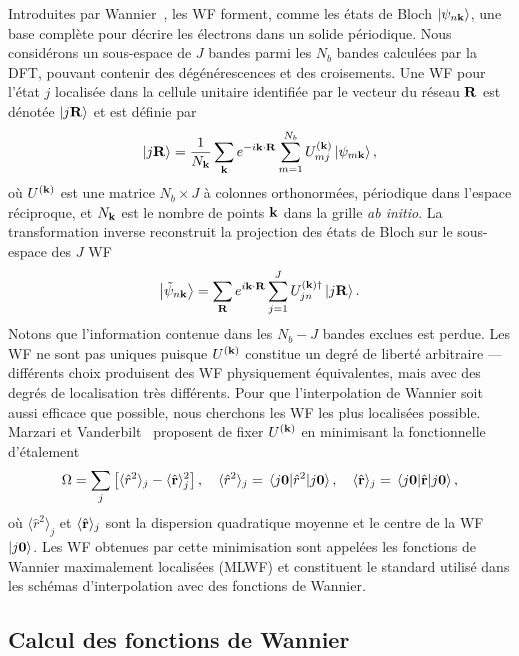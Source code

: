Introduites par Wannier~\cite{wannierStructureElectronicExcitation1937}, les WF forment, comme les états de Bloch $\ket{\psi_{n\mathbf{k}}}$, une base
complète pour décrire les électrons dans un solide périodique. Nous considérons
un sous-espace de $J$ bandes parmi les $N_b$ bandes calculées par
la DFT, pouvant contenir des dégénérescences et des croisements.
Une WF pour l'état $j$ localisée dans la cellule unitaire identifiée
par le vecteur du réseau $\mathbf{R}$ est dénotée $\ket{j\mathbf{R}}$ et est
définie par
\begin{equation}
    \ket{j\mathbf{R}} = \frac{1}{N_{\mathbf{k}}}\sum_{\mathbf{k}} e^{-i\mathbf{k}\cdot\mathbf{R}}
    \sum_{m=1}^{N_b} U_{mj}^{(\mathbf{k})}\ket{\psi_{m\mathbf{k}}},
    \label{eqn:c2_wf_1W}
\end{equation}
où $U^{(\mathbf{k})}$ est une matrice $N_b\times J$ à colonnes orthonormées,
périodique dans l'espace réciproque, et $N_{\mathbf{k}}$ est le nombre de
points $\mathbf{k}$ dans la grille \textit{ab initio}. La transformation
inverse reconstruit la projection des états de Bloch sur le
sous-espace des $J$ WF
\begin{equation}
    \ket{\tilde{\psi}_{n\mathbf{k}}}=\sum_{\mathbf{R}} e^{i\mathbf{k}\cdot\mathbf{R}}
    \sum_{j=1}^{J} U_{jn}^{(\mathbf{k})\dag}\ket{j\mathbf{R}}.
    \label{eqn:c2_wf_1B}
\end{equation}
Notons que l'information contenue dans les $N_b - J$ bandes exclues est
perdue. Les WF ne sont pas uniques puisque $U^{(\mathbf{k})}$ constitue un degré
de liberté arbitraire --- différents choix produisent des WF
physiquement équivalentes, mais avec des degrés de localisation
très différents. Pour que l'interpolation de Wannier soit aussi efficace que possible, nous cherchons les WF les plus localisées possible. Marzari et Vanderbilt~\cite{marzariMaximallyLocalizedGeneralized1997} proposent de fixer $U^{(\mathbf{k})}$ en minimisant la fonctionnelle d'étalement
\begin{equation}
    \Omega = \sum_j\left[\langle \hat{r}^2\rangle_j - \langle \hat{\rv} \rangle^2_j\right],\quad  \langle \hat{r}^2\rangle_j = \matrixel{j\bm 0}{\hat{r}^2}{j\bm 0},\quad\langle \hat{\rv} \rangle_j = \matrixel{j\bm 0}{\hat{\rv}}{j\bm 0},\label{eqn:spread}
\end{equation}
où $\langle \hat{r}^2\rangle_j$ et $\langle\hat{\mathbf{r}}\rangle_j$ sont la dispersion quadratique moyenne et le centre de la WF $\ket{j\bm 0}$. Les WF obtenues par cette minimisation sont appelées les fonctions de Wannier maximalement localisées (MLWF) et constituent le standard utilisé dans les schémas d'interpolation avec des fonctions de Wannier.

\subsection{Calcul des fonctions de Wannier}

